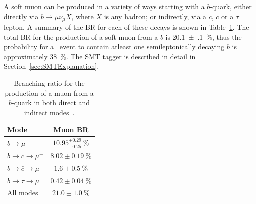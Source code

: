 A soft muon can be produced in a variety of ways starting with a $b$-quark, either directly via $b\rightarrow \mu\bar{\nu}_{\mu}X$, where $X$ is any hadron; or indirectly, via a $c$, $\bar{c}$ or a $\tau$ lepton. A summary of the BR for each of these decays is shown in Table~\ref{tbl:DetectorSLTBR}. The total BR for the production of a soft muon from a $b$ is \SI[multi-part-units=single,separate-uncertainty]{20.1(1)}{\percent}, thus the probability for a \ttbar\ event to contain atleast one semileptonically decaying $b$ is approximately \SI{38}{\percent}. The SMT tagger is described in detail in Section~\ref{sec:SMTExplanation}.

\begin{table}
  \centering
  \begin{tabular}{|l|c|}
  \hline
  Mode                                       & Muon BR \\
  \hline %
  $b\rightarrow \mu$                         & $10.95^{+0.29}_{-0.25}~\%$ \\
  $b\rightarrow c \rightarrow \mu^{+}$       & $8.02\pm0.19~\%$ \\
  $b\rightarrow \bar{c} \rightarrow \mu^{-}$ & $1.6\pm0.5~\%$ \\
  $b\rightarrow \tau \rightarrow \mu$        & $0.42\pm0.04~\%$ \\
  \hline %
  All modes                                  & $21.0\pm1.0~\%$ \\
  \hline %
  \end{tabular}
  \caption{Branching ratio for the production of a muon from a $b$-quark in both direct and indirect modes~\cite{Theory:PDGBooklet}.} \label{tbl:DetectorSLTBR}
\end{table}
